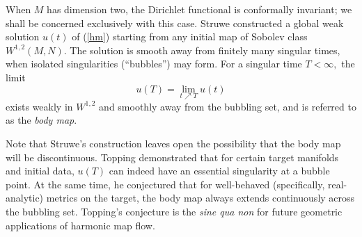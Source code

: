 \documentclass[12pt]{amsart}
\newcommand{\LB}{\left[}
\theoremstyle{others}
\numberwithin{equation}{section}
\begin{document}

When $M$ has dimension two, the Dirichlet functional is conformally invariant; we shall be concerned exclusively with this case. Struwe \cite{struwehmsurfaces} constructed a global weak solution $u(t)$ %
of (\ref{hm}) starting from any initial map of Sobolev class $W^{1,2}(M,N).$ The solution is smooth away from finitely many singular times, when isolated singularities (``bubbles'') may form. For a singular time $T < \infty,$ the limit
$$u(T) = \lim_{t \nearrow T} u(t)$$
exists weakly in $W^{1,2}$ and smoothly away from the bubbling set, %
and is referred to as the \emph{body map}. %

Note that Struwe's construction leaves open the possibility that the body map will be discontinuous.
Topping \cite{toppingwindingbehavior} demonstrated that for certain target manifolds and initial data, $u(T)$ can indeed have an essential singularity at a bubble point.
At the same time, he conjectured that for well-behaved (specifically, real-analytic) metrics on the target,
the body map always extends continuously across the bubbling set. Topping's conjecture is the {\it sine qua non} for future geometric applications of harmonic map flow.
\end{document}
